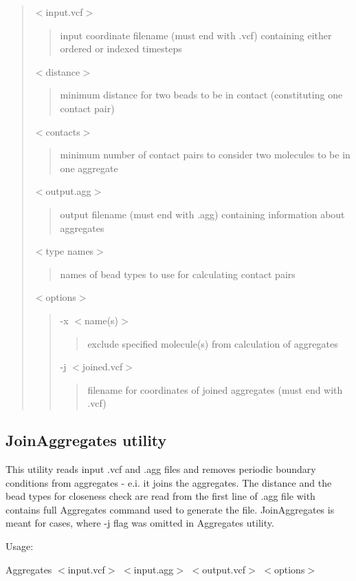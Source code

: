 \begin{quote}
{\ttfamily $<$input.\+vcf$>$} \begin{quote}
input coordinate filename (must end with {\ttfamily .vcf}) containing either ordered or indexed timesteps \end{quote}
{\ttfamily $<$distance$>$} \begin{quote}
minimum distance for two beads to be in contact (constituting one contact pair) \end{quote}
{\ttfamily $<$contacts$>$} \begin{quote}
minimum number of contact pairs to consider two molecules to be in one aggregate \end{quote}
{\ttfamily $<$output.\+agg$>$} \begin{quote}
output filename (must end with {\ttfamily .agg}) containing information about aggregates \end{quote}
{\ttfamily $<$type names$>$} \begin{quote}
names of bead types to use for calculating contact pairs \end{quote}
{\ttfamily $<$options$>$} \begin{quote}
{\ttfamily -\/x $<$name(s)$>$} \begin{quote}
exclude specified molecule(s) from calculation of aggregates \end{quote}
{\ttfamily -\/j $<$joined.\+vcf$>$} \begin{quote}
filename for coordinates of joined aggregates (must end with {\ttfamily .vcf}) \end{quote}
\end{quote}
\end{quote}
\hypertarget{Common_JoinAggregates}{}\subsection{Join\+Aggregates utility}\label{Common_JoinAggregates}
This utility reads input {\ttfamily .vcf} and {\ttfamily .agg} files and removes periodic boundary conditions from aggregates -\/ e.\+i. it joins the aggregates. The distance and the bead types for closeness check are read from the first line of {\ttfamily .agg} file with contains full Aggregates command used to generate the file. Join\+Aggregates is meant for cases, where {\ttfamily -\/j} flag was omitted in Aggregates utility.

Usage\+:

{\ttfamily Aggregates $<$input.\+vcf$>$ $<$input.\+agg$>$ $<$output.\+vcf$>$ $<$options$>$}

